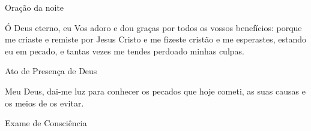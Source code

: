 \documentclass{book}
\begin{document}
\begin{center}
    Oração da noite
\end{center}
\begin{flushleft}
    Ó Deus eterno, eu Vos adoro e dou graças por todos os vossos benefícios: porque me criaste e remiste por Jesus Cristo e me fizeste cristão e me esperastes, estando eu em pecado, e tantas vezes me tendes perdoado minhas culpas.
\end{flushleft}
\begin{center}
    Ato de Presença de Deus
\end{center}
\begin{flushleft}
    Meu Deus, dai-me luz para conhecer os pecados que hoje cometi, as suas causas e os meios de os evitar.
\end{flushleft}
\begin{center}
    Exame de Consciência
\end{center}
\end{document}
